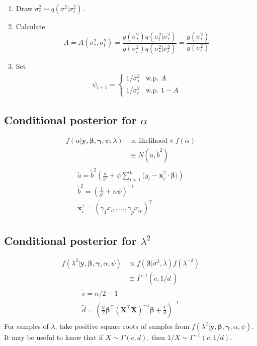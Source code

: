 \begin{enumerate}
	\item Draw $\sigma^2_* \sim q(\sigma^2|\sigma^2_t)$.
	\item Calculate
		\[
			A = A(\sigma^2_*, \sigma^2_t) = \frac{g(\sigma^2_*)q(\sigma^2_t|\sigma^2_*)}{g(\sigma^2_t)q(\sigma^2_*|\sigma^2_t)} =  \frac{g(\sigma^2_*)}{g(\sigma^2_t)}
		\]
	\item Set
	\begin{align*}
		\psi_{t+1} =
		\begin{cases}
			1/\sigma^2_*	&\text{w.p. } A\\
			1/\sigma^2_t	&\text{w.p. } 1-A 
		\end{cases}
	\end{align*}
\end{enumerate}

\subsection{Conditional posterior for $\alpha$}

\begin{align*}
	f(\alpha|\mathbf y,\boldsymbol\beta, \boldsymbol\gamma, \psi, \lambda)
	&\propto \text{likelihood}\times f(\alpha) \\
	&\equiv N(\tilde a, \tilde b^2)
\end{align*}
\begin{align*}
	\begin{gathered}
		\tilde a =  \tilde b^2 \left(\frac{a}{b^2} + \psi \sum_{i=1}^n \big(y_i - \mathbf x_i^\gamma \cdot \boldsymbol\beta \big) \right) \\
		\tilde b^2 = \left(\frac{1}{b^2} + n\psi \right)^{-1} \\
		\mathbf x_i^\gamma = (\gamma_1 x_{i1}, \dots, \gamma_p x_{ip})^\top
	\end{gathered}
\end{align*}

\subsection{Conditional posterior for $\lambda^2$}
\vspace{-3mm}

\begin{align*}
	f(\lambda^2|\mathbf y,\boldsymbol\beta, \boldsymbol\gamma, \alpha, \psi) 
	&\propto f(\boldsymbol\beta|\sigma^2, \lambda)f(\lambda^{-2}) \\ 
	&\equiv \Gamma^{-1}(\tilde c, 1/\tilde d \, )
\end{align*}
\begin{align*}
	\begin{gathered}
		\tilde c =  n/2 -1 \\
		\tilde d = \left( \frac{\psi}{2} \boldsymbol\beta^\top (\mathbf X^\top \mathbf X)^{-1}\boldsymbol\beta + \frac{1}{d} \right)^{-1}
	\end{gathered}
\end{align*}
For samples of $\lambda$, take positive square roots of samples from $f(\lambda^2|\mathbf y,\boldsymbol\beta, \boldsymbol\gamma, \alpha, \psi)$. It may be useful to know that if $X \sim \Gamma(c,d)$, then $1/X \sim \Gamma^{-1}(c,1/d)$.


